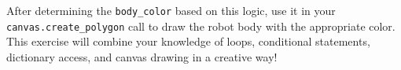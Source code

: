 After determining the \texttt{body\_color} based on this logic, use it in your \texttt{canvas.create\_polygon} call to draw the robot body with the appropriate color. This exercise will combine your knowledge of loops, conditional statements, dictionary access, and canvas drawing in a creative way!












